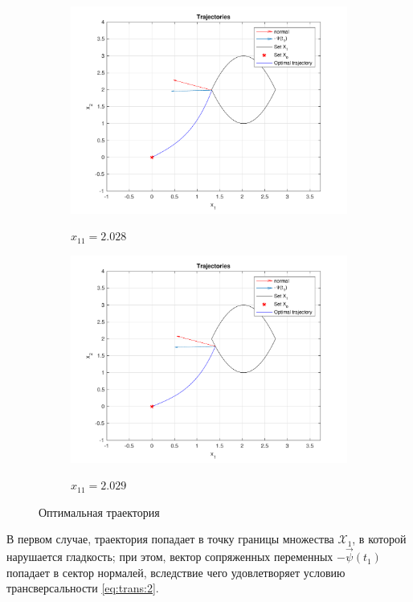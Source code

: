 \documentclass[11pt, oneside, final]{article}
\theoremstyle{break}
\numberwithin{equation}{section}
\theoremstyle{plain}
\theoremstyle{definition}
\begin{document}
    \begin{figure}[H]
        \begin{subfigure}{0.5\linewidth}
            \centering
            \includegraphics[width=\linewidth]{s3fig1}
            \label{pic:s3:1}
            \caption{\(x_{11} = 2.028\)}
        \end{subfigure}
        \begin{subfigure}{0.5\linewidth}
            \centering
            \includegraphics[width=\linewidth]{s3fig2}
            \label{pic:s3:2}
            \caption{\(x_{11} = 2.029\)}
        \end{subfigure}
        \caption{Оптимальная траектория}
    \end{figure} 
    \noindent В первом случае, траектория попадает в точку границы множества \(\mathcal{X}_1\), в которой нарушается гладкость; при этом, вектор сопряженных переменных \(-\vec\psi(t_1)\) попадает в сектор нормалей, вследствие чего удовлетворяет условию трансверсальности \eqref{eq:trans:2}.
    \pagebreak
\end{document}
